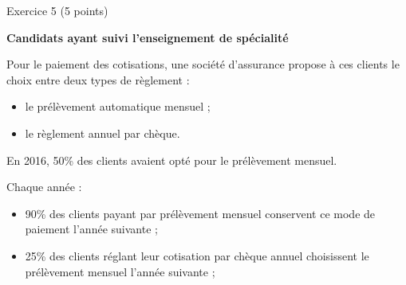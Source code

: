 
%
\begin{h2}Exercice 5 (5 points)\end{h2}
\par
\textbf{Candidats ayant suivi l'enseignement de spécialité}
\par
Pour le paiement des cotisations, une société d'assurance propose à ces clients le choix entre deux types de règlement :
\par
\begin{itemize}
     \item
     le prélèvement automatique mensuel ;
     \item
     le règlement annuel par chèque.
\end{itemize}
\par
En 2016, 50\% des clients avaient opté pour le prélèvement mensuel.
\par
Chaque année :
\begin{itemize}
     \item
     90\% des clients payant par prélèvement mensuel conservent ce mode de paiement l'année suivante ;
     \item
     25\% des clients réglant leur cotisation par chèque annuel choisissent le prélèvement mensuel l'année suivante ;
\end{itemize}

